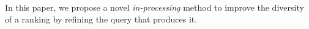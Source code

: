




%
 In this paper, we propose a novel \emph{in-processing} method to improve the diversity of a ranking by refining the query that produces it.%
 

